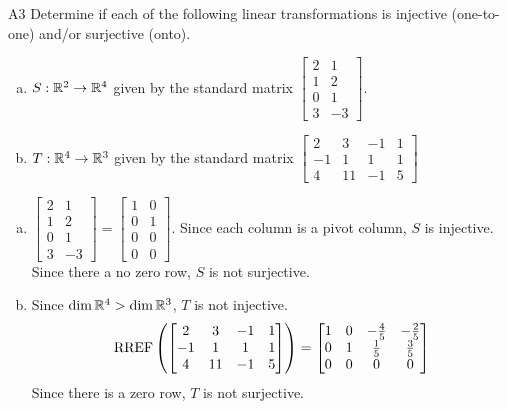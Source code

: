 \documentclass{sbgLAsemi}
\begin{document}
\begin{problem}{A3}
Determine if each of the following linear transformations is injective (one-to-one) and/or surjective (onto).
\begin{enumerate}[(a)]
\item $S: \mathbb{R}^2 \rightarrow \mathbb{R}^4$ given by the standard matrix $\begin{bmatrix} 2 & 1 \\ 1 & 2 \\ 0 & 1 \\ 3 & -3 \end{bmatrix}$.
\item $T: \mathbb{R}^4 \rightarrow \mathbb{R}^3$ given by the standard matrix $\begin{bmatrix} 2 & 3 & -1 & 1 \\ -1 & 1 & 1 & 1 \\ 4 & 11 & -1 & 5 \end{bmatrix}$
\end{enumerate}
\end{problem}
\begin{solution}
\begin{enumerate}[(a)]
\item $ \begin{bmatrix} 2 & 1 \\ 1 & 2 \\ 0 & 1 \\ 3 & -3 \end{bmatrix}=\begin{bmatrix}1 & 0 \\ 0 & 1 \\ 0 & 0 \\ 0 & 0  \end{bmatrix}$.  Since each column is a pivot column, $S$ is injective.  Since there a no zero row, $S$ is not surjective.
\item Since $\dim \mathbb{R}^4 > \dim \mathbb{R}^3$, $T$ is not injective.
$$\operatorname{RREF}\left(\begin{bmatrix} 2 & 3 & -1 & 1 \\ -1 & 1 & 1 & 1 \\ 4 & 11 & -1 & 5 \end{bmatrix}\right) = \begin{bmatrix} 1 & 0  & -\frac{4}{5} & -\frac{2}{5} \\ 0 & 1 & \frac{1}{5} & \frac{3}{5} \\ 0 & 0 & 0 & 0 \end{bmatrix}$$
Since there is a zero row, $T$ is not surjective.
\end{enumerate}
\end{solution}
\end{document}

